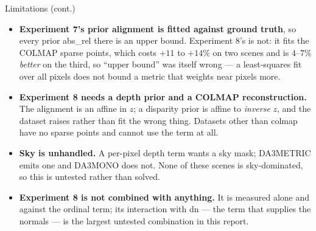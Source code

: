 \documentclass[aspectratio=169,9pt]{beamer}
\makeatletter
\newcommand{\code}[1]{{\ttfamily\fontsize{0.92\f@size}{\f@baselineskip}\selectfont #1}}
\makeatother
\begin{document}
\begin{frame}{Limitations (cont.)}
  \begin{itemize}
    \item \textbf{Experiment 7's prior alignment is fitted against ground truth}, so every prior
          \code{abs\_rel} there is an upper bound. Experiment 8's is not: it fits the COLMAP
          sparse points, which costs $+11$ to $+14\%$ on two scenes and is $4$--$7\%$
          \emph{better} on the third, so ``upper bound'' was itself wrong --- a least-squares fit
          over all pixels does not bound a metric that weights near pixels more.
    \item \textbf{Experiment 8 needs a depth prior and a COLMAP reconstruction.} The alignment is
          an affine in $z$; a disparity prior is affine to \emph{inverse} $z$, and the dataset
          raises rather than fit the wrong thing. Datasets other than \code{colmap} have no
          sparse points and cannot use the term at all.
    \item \textbf{Sky is unhandled.} A per-pixel depth term wants a sky mask; \code{DA3METRIC}
          emits one and \code{DA3MONO} does not. None of these scenes is sky-dominated, so this
          is untested rather than solved.
    \item \textbf{Experiment 8 is not combined with anything.} It is measured alone and against
          the ordinal term; its interaction with \code{dn} --- the term that supplies the normals
          --- is the largest untested combination in this report.
  \end{itemize}
\end{frame}
\end{document}
